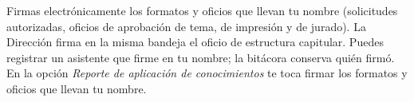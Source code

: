 \documentclass[11pt,a4paper]{article}
\begin{document}
{\small\tableofcontents}
\newpage
\begin{quevasahacer}
Firmas electrónicamente los formatos y oficios que llevan tu nombre (solicitudes autorizadas, oficios de aprobación de tema, de impresión y de jurado). La Dirección firma en la misma bandeja el oficio de estructura capitular. Puedes registrar un asistente que firme en tu nombre; la bitácora conserva quién firmó. En la opción \emph{Reporte de aplicación de conocimientos} te toca firmar los formatos y oficios que llevan tu nombre.
\end{quevasahacer}



\end{document}
